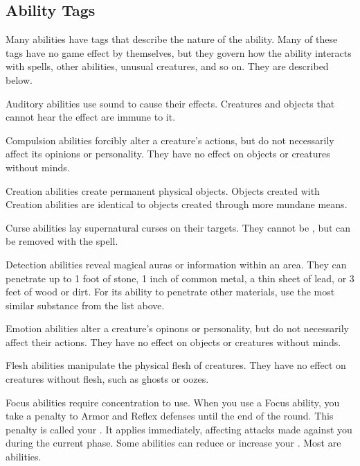     \subsection{Ability Tags}\label{Ability Tags}

        Many abilities have tags that describe the nature of the ability.
        Many of these tags have no game effect by themselves, but they govern how the ability interacts with spells, other abilities, unusual creatures, and so on.
        They are described below.

         Auditory abilities use sound to cause their effects.
        Creatures and objects that cannot hear the effect are immune to it.

         Compulsion abilities forcibly alter a creature's actions, but do not necessarily affect its opinions or personality.
        They have no effect on objects or creatures without minds.

         Creation abilities create permanent physical objects.
        Objects created with Creation abilities are identical to objects created through more mundane means.

         Curse abilities lay supernatural curses on their targets.
        They cannot be , but can be removed with the  spell.

         Detection abilities reveal magical auras or information within an area.
        They can penetrate up to 1 foot of stone, 1 inch of common metal, a thin sheet of lead, or 3 feet of wood or dirt.
        For its ability to penetrate other materials, use the most similar substance from the list above.

         Emotion abilities alter a creature's opinons or personality, but do not necessarily affect their actions.
        They have no effect on objects or creatures without minds.

         Flesh abilities manipulate the physical flesh of creatures.
        They have no effect on creatures without flesh, such as ghosts or oozes.

        \label{Focus} Focus abilities require concentration to use.
        When you use a Focus ability, you take a  penalty to Armor and Reflex defenses until the end of the round.
        This penalty is called your .
        It applies immediately, affecting attacks made against you during the current phase.
        Some abilities can reduce or increase your .
        Most  are  abilities.

